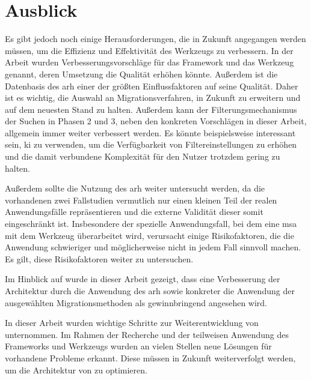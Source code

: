 \section{Ausblick}

Es gibt jedoch noch einige Herausforderungen, die in Zukunft angegangen werden müssen, um die Effizienz und Effektivität des Werkzeugs zu verbessern.
In der Arbeit wurden Verbesserungsvorschläge für das Framework und das Werkzeug genannt, deren Umsetzung die Qualität erhöhen könnte.
Außerdem ist die Datenbasis des \gls{arh} einer der größten Einflussfaktoren auf seine Qualität.
Daher ist es wichtig, die Auswahl an Migrationsverfahren, \bpp in Zukunft zu erweitern und auf dem neuesten Stand zu halten.
Außerdem kann der Filterungsmechanismus der Suchen in Phasen 2 und 3, neben den konkreten Vorschlägen in dieser Arbeit, allgemein immer weiter verbessert werden.
Es könnte beispielsweise interessant sein, \gls{ki} zu verwenden, um die Verfügbarkeit von Filtereinstellungen zu erhöhen und die damit verbundene Komplexität für den Nutzer trotzdem gering zu halten.

Außerdem sollte die Nutzung des \gls{arh} weiter untersucht werden, da die vorhandenen zwei Fallstudien vermutlich nur einen kleinen Teil der realen Anwendungsfälle repräsentieren und die externe Validität dieser somit eingeschränkt ist.
Insbesondere der spezielle Anwendungsfall, bei dem eine \gls{msa} mit dem Werkzeug überarbeitet wird, verursacht einige Risikofaktoren, die die Anwendung schwieriger und möglicherweise nicht in jedem Fall sinnvoll machen.
Es gilt, diese Risikofaktoren weiter zu untersuchen.

Im Hinblick auf \jf wurde in dieser Arbeit gezeigt, dass eine Verbesserung der Architektur durch die Anwendung des \gls{arh} sowie konkreter die Anwendung der ausgewählten Migrationsmethoden als gewinnbringend angesehen wird.

In dieser Arbeit wurden wichtige Schritte zur Weiterentwicklung von \jf unternommen. 
Im Rahmen der Recherche und der teilweisen Anwendung des Frameworks und Werkzeugs wurden an vielen Stellen neue Lösungen für vorhandene Probleme erkannt. 
Diese müssen in Zukunft weiterverfolgt werden, um die Architektur von \jf zu optimieren.

